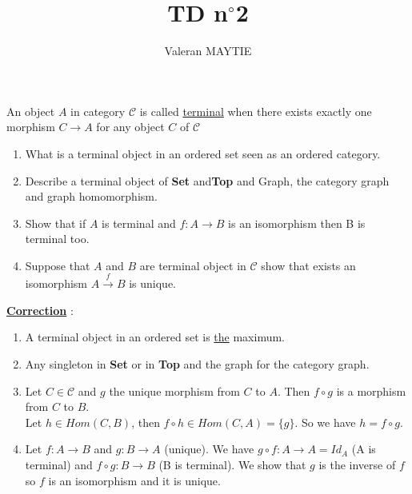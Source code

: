 \documentclass{article}
\title{TD n$^\circ$2}
\author{Valeran MAYTIE}
\date{}
\theoremstyle{plain}
\begin{document}
  \maketitle
  
  An object $A$ in category $\mathcal C$ is called \underline{terminal} when
  there exists exactly one morphism $C \to A$ for any object $C$ of $\mathcal C$

  \begin{enumerate}
    \item What is a terminal object in an ordered set seen as an ordered
      category.
    \item Describe a terminal object of {\bf Set} and{\bf Top} and Graph, the
      category graph and graph homomorphism.
    \item Show that if $A$ is terminal and $f : A \to B$ is an isomorphism then B
      is terminal too.
    \item Suppose that $A$ and $B$ are terminal object in $\mathcal C$ show that
      exists an isomorphism $A \xrightarrow{f} B$ is unique.
  \end{enumerate}

  \underline{\bf Correction} :

  \begin{enumerate}
    \item A terminal object in an ordered set is \underline{the} maximum.
    \item Any singleton in {\bf Set} or in {\bf Top} and the graph for the
      category graph.
    \item Let $C \in \mathcal C$ and $g$ the unique morphism from $C$ to $A$.
      Then $f \circ g$ is a morphism from $C$ to $B$. \\ Let $h \in Hom(C, B)$,
      then $f \circ h \in Hom(C, A) = \{g\}$. So we have $h = f \circ g$.

      \begin{center}
      \end{center}

    \item Let $f : A \to B$ and $g : B \to A$ (unique). We have $g \circ f : A \to A =
      Id_A$ (A is terminal) and $f \circ g : B \to B$ (B is terminal). We show
      that $g$ is the inverse of $f$ so $f$ is an isomorphism and it is unique. 
  \end{enumerate}
\end{document}
